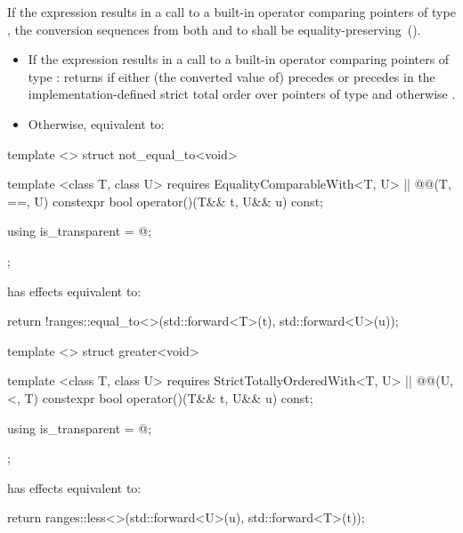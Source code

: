 {\begin{itemdescr}
\pnum
\requires If the expression 
results in a call to a built-in operator \tcode{==} comparing pointers of type
, the conversion sequences from both  and  to 
shall be equality-preserving~().

\pnum
\effects
\begin{itemize}
\item
If the expression  results in a
call to a built-in operator \tcode{==} comparing pointers of type :
returns  if either (the converted value of)  precedes
 or  precedes  in the implementation-defined strict
total order over pointers of type  and otherwise .

\item
Otherwise, equivalent to: 
\end{itemize}
\end{itemdescr}

%
\begin{itemdecl}
template <> struct not_equal_to<void> {
  template <class T, class U>
    requires EqualityComparableWith<T, U> || @\textit{}@(T, ==, U)
  constexpr bool operator()(T&& t, U&& u) const;

  using is_transparent = @\unspec@;
};
\end{itemdecl}

\begin{itemdescr}
\pnum
{} has effects equivalent to:
\begin{codeblock}
return !ranges::equal_to<>{}(std::forward<T>(t), std::forward<U>(u));
\end{codeblock}
\end{itemdescr}

%
\begin{itemdecl}
template <> struct greater<void> {
  template <class T, class U>
    requires StrictTotallyOrderedWith<T, U> || @\textit{}@(U, <, T)
  constexpr bool operator()(T&& t, U&& u) const;

  using is_transparent = @\unspec@;
};
\end{itemdecl}

\begin{itemdescr}
\pnum
{} has effects equivalent to:
\begin{codeblock}
return ranges::less<>{}(std::forward<U>(u), std::forward<T>(t));
\end{codeblock}
\end{itemdescr}

}
